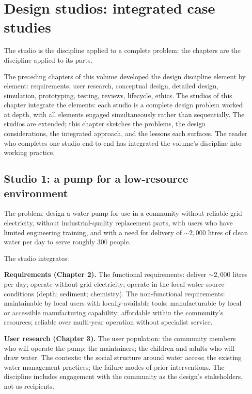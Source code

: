 \chapter{Design studios: integrated case studies}
\label{vol11:ch12}

\epigraph{The studio is the discipline applied to a complete problem; the chapters are the discipline applied to its parts.}{}


\noindent
The preceding chapters of this volume developed the design discipline element by element: requirements, user research, conceptual design, detailed design, simulation, prototyping, testing, reviews, lifecycle, ethics. The studios of this chapter integrate the elements: each studio is a complete design problem worked at depth, with all elements engaged simultaneously rather than sequentially. The studios are extended; this chapter sketches the problems, the design considerations, the integrated approach, and the lessons each surfaces. The reader who completes one studio end-to-end has integrated the volume's discipline into working practice.

\section{Studio 1: a pump for a low-resource environment}

The problem: design a water pump for use in a community without reliable grid electricity, without industrial-quality replacement parts, with users who have limited engineering training, and with a need for delivery of $\sim 2{,}000$ litres of clean water per day to serve roughly 300 people.

The studio integrates:

\textbf{Requirements (Chapter 2).} The functional requirements: deliver $\sim 2{,}000$ litres per day; operate without grid electricity; operate in the local water-source conditions (depth; sediment; chemistry). The non-functional requirements: maintainable by local users with locally-available tools; manufacturable by local or accessible manufacturing capability; affordable within the community's resources; reliable over multi-year operation without specialist service.

\textbf{User research (Chapter 3).} The user population: the community members who will operate the pump; the maintainers; the children and adults who will draw water. The contexts: the social structure around water access; the existing water-management practices; the failure modes of prior interventions. The discipline includes engagement with the community as the design's stakeholders, not as recipients.

